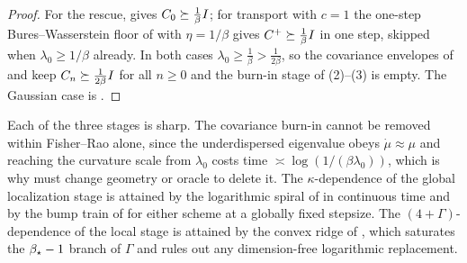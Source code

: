 \begin{proof}
For the rescue,  gives $C_0\succeq\tfrac1\beta I$; for transport with
$c=1$ the one-step Bures--Wasserstein floor of  with $\eta=1/\beta$ gives
$C^+\succeq\tfrac1\beta I$ in one step, skipped when $\lambda_0\geq1/\beta$ already. In both
cases $\lambda_0\geq\tfrac1\beta>\tfrac1{2\beta}$, so the covariance envelopes of
 and  keep $C_n\succeq\tfrac1{2\beta}I$ for all $n\geq0$
and the burn-in stage of (2)--(3) is empty. The Gaussian case is
.
\end{proof}

Each of the three stages is sharp. The covariance burn-in cannot be removed within Fisher--Rao
alone, since the underdispersed eigenvalue obeys $\dot\mu\approx\mu$ and reaching the curvature
scale from $\lambda_0$ costs time $\asymp\log(1/(\beta\lambda_0))$, which is why
 must change geometry or oracle to delete it. The
$\kappa$-dependence of the global localization stage is attained by the logarithmic spiral of
 in continuous time and by the bump train of  for
either scheme at a globally fixed stepsize. The $(4+\Gamma)$-dependence of the local stage is
attained by the convex ridge of , which saturates the $\beta_\star-1$ branch
of $\Gamma$ and rules out any dimension-free logarithmic replacement.

